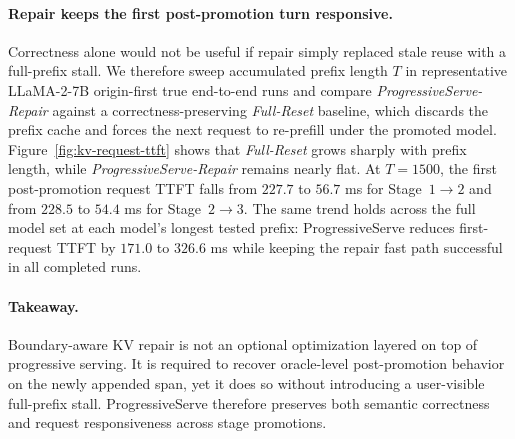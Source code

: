 \paragraph{Repair keeps the first post-promotion turn responsive.}
Correctness alone would not be useful if repair simply replaced stale reuse with a full-prefix stall. We therefore sweep accumulated prefix length \(T\) in representative LLaMA-2-7B origin-first true end-to-end runs and compare \textit{ProgressiveServe-Repair} against a correctness-preserving \textit{Full-Reset} baseline, which discards the prefix cache and forces the next request to re-prefill under the promoted model. Figure~\ref{fig:kv-request-ttft} shows that \textit{Full-Reset} grows sharply with prefix length, while \textit{ProgressiveServe-Repair} remains nearly flat. At \(T{=}1500\), the first post-promotion request TTFT falls from \(227.7\) to \(56.7\) ms for Stage~\(1\!\rightarrow\!2\) and from \(228.5\) to \(54.4\) ms for Stage~\(2\!\rightarrow\!3\). The same trend holds across the full model set at each model's longest tested prefix: ProgressiveServe reduces first-request TTFT by \(171.0\) to \(326.6\) ms while keeping the repair fast path successful in all completed runs.

\paragraph{Takeaway.}
Boundary-aware KV repair is not an optional optimization layered on top of progressive serving. It is required to recover oracle-level post-promotion behavior on the newly appended span, yet it does so without introducing a user-visible full-prefix stall. ProgressiveServe therefore preserves both semantic correctness and request responsiveness across stage promotions.


